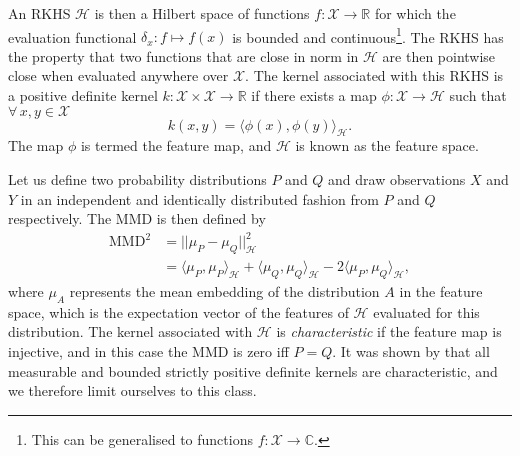 An RKHS $\mathcal{H}$ is then a Hilbert space of functions $f : \mathcal{X} \rightarrow \mathbb{R}$ for which the evaluation functional $\delta_x : f \mapsto f(x)$ is bounded and continuous\footnote{This can be generalised to functions $f : \mathcal{X} \rightarrow \mathbb{C}$.}.
The RKHS has the property that two functions that are close in norm in $\mathcal{H}$ are then pointwise close when evaluated anywhere over $\mathcal{X}$.
The kernel associated with this RKHS is a positive definite kernel $k : \mathcal{X} \times \mathcal{X} \rightarrow \mathbb{R}$ if there exists a map $\phi : \mathcal{X} \rightarrow \mathcal{H}$ such that $\forall\, x,y \in \mathcal{X}$
\begin{equation}
    k(x,y) = \langle \phi(x), \phi(y) \rangle_\mathcal{H}.
\end{equation}
The map $\phi$ is termed the feature map, and $\mathcal{H}$ is known as the feature space.

Let us define two probability distributions $P$ and $Q$ and draw observations $X$ and $Y$ in an independent and identically distributed fashion from $P$ and $Q$ respectively.
The MMD is then defined by
\begin{equation}\label{Eq:MmdDef}
\begin{aligned}
    \mathrm{MMD}^2 &= ||\mu_P - \mu_Q ||_\mathcal{H}^2\\
    &= \langle \mu_P, \mu_P \rangle_\mathcal{H} +
       \langle \mu_Q, \mu_Q \rangle_\mathcal{H} -
       2 \langle \mu_P, \mu_Q \rangle_\mathcal{H},
\end{aligned}
\end{equation}
where $\mu_A$ represents the mean embedding of the distribution $A$ in the feature space, which is the expectation vector of the features of $\mathcal{H}$ evaluated for this distribution.
The kernel associated with $\mathcal{H}$ is \emph{characteristic} if the feature map is injective, and in this case the MMD is zero iff $P = Q$.
It was shown by \citet{Sriperumbudur2009} that all measurable and bounded strictly positive definite kernels are characteristic, and we therefore limit ourselves to this class.

